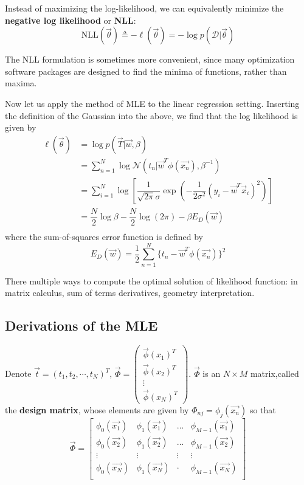 Instead of maximizing the log-likelihood, we can equivalently minimize the \textbf{negative log likelihood} or \textbf{NLL}:
\begin{equation}
\text{NLL}(\vec{\theta}) \triangleq -\ell(\vec{\theta})=-\log p(\mathcal{D}|\vec{\theta})
\end{equation}

The NLL formulation is sometimes more convenient, since many optimization software packages are designed to find the minima of functions, rather than maxima.

Now let us apply the method of MLE to the linear regression setting. Inserting the definition of the Gaussian into the above, we find that the log likelihood is given by
\begin{align}
\ell(\vec{\theta}) &= \log p(\vec{T}|\vec{w},\beta) \\
&=\sum_{n=1}^{N}\log \mathcal{N}(t_n|\vec{w}^T\phi(\vec{x_n}),\beta^{-1}) \\
&=\sum\limits_{i=1}^N \log\left[\dfrac{1}{\sqrt{2\pi}\sigma}\exp\left(-\dfrac{1}{2\sigma^2}(y_i-\vec{w}^T\vec{x}_i)^2\right)\right] \\
&=\dfrac{N}{2}\log \beta-\dfrac{N}{2}\log (2\pi)-\beta E_D(\vec{w}) \\
\end{align}
where the sum-of-squares error function is defined by
\begin{equation}
E_D(\vec{w}) =
\dfrac{1}{2}\sum_{n=1}^{N}\{t_n-\vec{w}^T\phi(\vec{x_n}) \}^2
\end{equation}

There multiple ways to compute the optimal solution of likelihood function: in matrix calculus, sum of terms derivatives, geometry interpretation.

\subsection{Derivations of the MLE}
Denote $\vec{t}=(t_1,t_2,\cdots,t_N)^T$, $\vec{\Phi}=\left(\begin{array}{c}\vec{\phi}(x_1)^T \\ \vec{\phi}(x_2)^T \\ \vdots \\ \vec{\phi}(x_N)^T\end{array}\right)$.
$\vec{\Phi}$ is an $N\times M$ matrix,called the \textbf{design matrix}, whose elements are given by $\Phi_{nj}=\phi_j(\vec{x_n})$ so that
\begin{equation}
\vec{\Phi}=
\begin{bmatrix}
\phi_0(\vec{x_1}) &	\phi_1(\vec{x_1}) &...&\phi_{M-1}(\vec{x_1}) \\
\phi_0(\vec{x_2}) & \phi_1(\vec{x_2}) &...&\phi_{M-1}(\vec{x_2}) \\
\vdots &\vdots &\vdots&\vdots \\
\phi_0(\vec{x_N})& \phi_1(\vec{x_{N}})& \cdot &\phi_{M-1}(\vec{x_N})\\
\end{bmatrix}
\end{equation}

